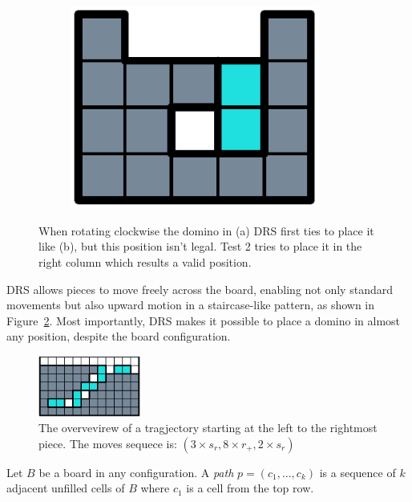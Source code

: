 \begin{figure}[ht]
\begin{subfigure}[b]{0.15\textwidth}
    \includegraphics[width=0.9\textwidth]{pictures/dominoes/drs-3.pdf}
    \caption{}
  \end{subfigure}
  \caption{When rotating clockwise the domino in (a) DRS first ties to place it like (b), but this position isn't legal. Test 2 tries to place it in the right column which results a valid position.}
  \label{dom:drs}
\end{figure}

DRS allows pieces to move freely across the board, enabling not only standard movements but also upward motion in a staircase-like pattern, as shown in Figure~\ref{dom:staircase}. Most importantly, DRS makes it possible to place a domino in almost any position, despite the board configuration.

\begin{figure}
  \centering
  \includegraphics[width=0.3\textwidth]{pictures/dominoes/staricase.pdf}
  \caption{The overvevirew of a tragjectory starting at the left to the rightmost piece. The moves sequece is: $(3 \times s_r, 8 \times r_+, 2 \times s_r)$}
  \label{dom:staircase}
\end{figure}

\begin{definition}
  Let $B$ be a board in any configuration. A \emph{path} $p = (c_1,\dots , c_k) $ is a sequence of $k$ adjacent unfilled cells of $B$ where $c_1$ is a cell from the top row.
\end{definition}

